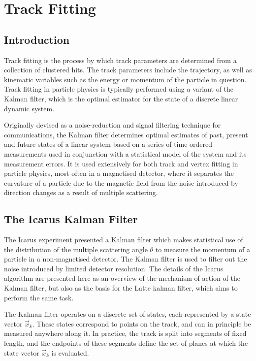 \chapter{Track Fitting}\label{chapter:KalmanFilter}

\section{Introduction}
Track fitting is the process by which track parameters are determined from a collection of clustered hits. The track parameters include the trajectory, as well as kinematic variables such as the energy or momentum of the particle in question. Track fitting in particle physics is typically performed using a variant of the Kalman filter, which is the optimal estimator for the state of a discrete linear dynamic system.

Originally devised as a noise-reduction and signal filtering technique for communications, the Kalman filter determines optimal estimates of past, present and future states of a linear system based on a series of time-ordered measurements used in conjunction with a statistical model of the system and its measurement errors. It is used extensively for both track and vertex fitting in particle physics, most often in a magnetised detector, where it separates the curvature of a particle due to the magnetic field from the noise introduced by direction changes as a result of multiple scattering.

\section{The Icarus Kalman Filter}
The Icarus\citep{Amerio2004} experiment presented a Kalman filter\citep{Fruhwirth1987} which makes statistical use of the distribution of the multiple scattering angle $\theta$ to measure the momentum of a particle in a non-magnetised detector\citep{Ankowski2006}. The Kalman filter is used to filter out the noise introduced by limited detector resolution. The details of the Icarus algorithm are presented here as an overview of the mechanism of action of the Kalman filter, but also as the basis for the Latte kalman filter, which aims to perform the same task.

The Kalman filter operates on a discrete set of states, each represented by a state vector $\vec{x}_k$. These states correspond to points on the track, and can in principle be measured anywhere along it. In practice, the track is split into segments of fixed length, and the endpoints of these segments define the set of planes at which the state vector $\vec{x}_k$ is evaluated. 


